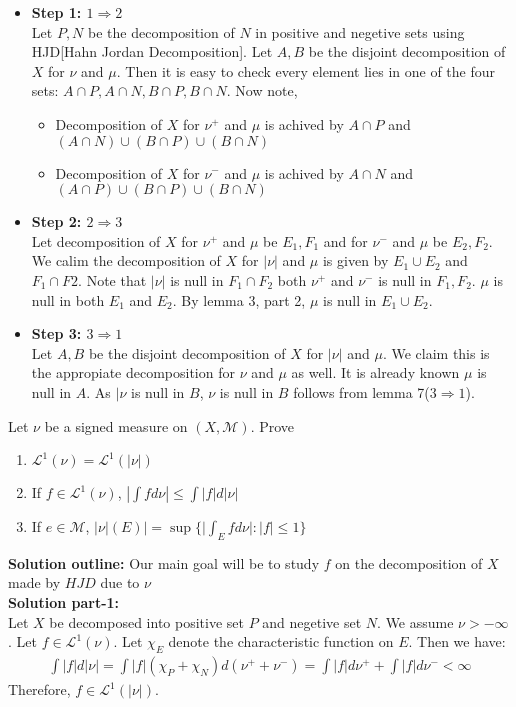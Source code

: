 \documentclass[notoc]{tufte-book}
\begin{document}
\begin{itemize}
	\item \textbf{Step 1: $1\Rightarrow 2$}\\
	Let $P,N$ be the decomposition of $N$ in positive and negetive sets using HJD[Hahn Jordan Decomposition]. Let $A,B$ be the disjoint decomposition of $X$ for $\nu$ and $\mu$. Then it is easy to check every element lies in one of the four sets: $A\cap P,A\cap N,B\cap P,B\cap N$. Now note,
	\begin{itemize}
		\item Decomposition of $X$ for $\nu^+$ and $\mu$ is achived by $A\cap P$ and $(A\cap N)\cup (B\cap P)\cup(B\cap N)$
		\item Decomposition of $X$ for $\nu^-$ and $\mu$ is achived by $A\cap N$ and $(A\cap P)\cup (B\cap P)\cup(B\cap N)$
	\end{itemize} 
	\item  \textbf{Step 2: $2\Rightarrow 3$}\\
	Let decomposition of $X$ for $\nu^+$ and $\mu$ be $E_1,F_1$ and for $\nu^-$ and $\mu$ be $E_2,F_2$. We calim the decomposition of $X$ for $|\nu|$ and $\mu$ is given by $E_1\cup E_2$ and $F_1\cap F2$.
	Note that $|\nu|$ is null in $F_1\cap F_2$ both $\nu^+$ and $\nu^-$ is null in $F_1,F_2$. $\mu$ is null in both $E_1$ and $E_2$. By lemma 3, part 2, $\mu$ is null in $E_1\cup E_2$.
	\item   \textbf{Step 3: $3\Rightarrow 1$}\\
	Let $A,B$ be the disjoint decomposition of $X$ for $|\nu|$ and $\mu$. We claim this is the appropiate decomposition for $\nu$ and $\mu$ as well. It is already known $\mu$ is null in $A$. As $|\nu$ is null in $B$, $\nu$ is null in $B$ follows from lemma 7($3\Rightarrow1$). 
\end{itemize}



\begin{tcolorbox}[colback=c4,colframe=c3,title=Problem 3.3]
	Let $\nu$ be a signed measure on $(X,\mathcal M)$. Prove
	\begin{enumerate}
		\item $\mathcal L^1(\nu)=\mathcal L^1(|\nu|)$
		\item If $f\in\mathcal{L}^1(\nu)$, $|\int fd\nu|\leq \int|f|d|\nu|$
		\item If $e\in\mathcal M$, $|\nu|(E)|=\sup \{|\int_Efd\nu|:|f|\leq 1\}$
	\end{enumerate}
\end{tcolorbox}
\textbf{Solution outline:} Our main goal will be to study $f$ on the decomposition of $X$ made by $HJD$ due to $\nu$\\
\textbf{Solution part-1:}\\
Let $X$ be decomposed into positive set $P$ and negetive set $N$. We assume $\nu>-\infty$. Let $f\in\mathcal{L}^1(\nu)$. Let $\chi_E$ denote the characteristic function on $E$. Then we have:
\begin{align}
	\int|f|d|\nu|=\int|f|(\chi_P+\chi_N)d(\nu^++\nu^-)=\int|f|d\nu^++\int|f|d\nu^-<\infty
\end{align}
Therefore, $f\in\mathcal L^1(|\nu|)$.\\
\end{document}
